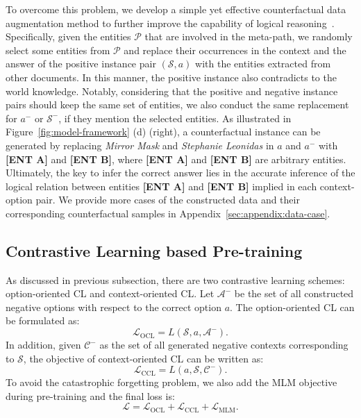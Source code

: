 To overcome this problem, we develop a simple yet effective counterfactual data augmentation method to further improve the capability of logical reasoning~\citep{counterfactual-ner}. 
Specifically, given the entities $\mathcal{P}$ that are involved in the meta-path, we randomly select some entities from $\mathcal{P}$ and replace their occurrences in the context and the answer of the positive instance pair $(\mathcal{S}, a)$ with the entities extracted from other documents. In this manner, the positive instance also contradicts to the world knowledge.
Notably, considering that the positive and negative instance pairs should keep the same set of entities, we also conduct the same replacement for $a^-$ or $\mathcal{S}^-$, if they mention the selected entities.
As illustrated in Figure~\ref{fig:model-framework} (d) (right), a counterfactual instance can be generated by replacing \textit{Mirror Mask} and \textit{Stephanie Leonidas} in $a$ and $a^-$ with \textbf{[ENT A]} and \textbf{[ENT B]}, where \textbf{[ENT A]} and \textbf{[ENT B]} are arbitrary entities.
Ultimately, the key to infer the correct answer lies in the accurate inference of the logical relation between entities \textbf{[ENT A]} and \textbf{[ENT B]} implied in each context-option pair.
We provide more cases of the constructed data and their corresponding counterfactual samples in Appendix~\ref{sec:appendix:data-case}.



\subsection{Contrastive Learning based Pre-training}
\label{sec:method:cl}

As discussed in previous subsection, there are 
two contrastive learning schemes: option-oriented CL and context-oriented CL. 
Let $\mathcal{A}^-$ be the set of all constructed negative options with respect to the correct option $a$. The option-oriented CL can be formulated as:
\begin{equation}
\mathcal{L}_{\mathrm{OCL}}=L(\mathcal{S},a,\mathcal{A}^-).
    \label{eqn:ocl}
\end{equation}
In addition, given $\mathcal{C}^-$ as the set of all generated negative contexts corresponding to $\mathcal{S}$, the objective of context-oriented CL can be written as:
\begin{equation}
\mathcal{L}_{\mathrm{CCL}}=L(a,\mathcal{S},\mathcal{C}^-).
    \label{eqn:ccl}
\end{equation}
To avoid the catastrophic forgetting problem, we also add the MLM objective during pre-training and the final loss is:
\begin{equation}
\mathcal{L}=\mathcal{L}_{\mathrm{OCL}} + \mathcal{L}_{\mathrm{CCL}}+\mathcal{L}_{\mathrm{MLM}}.
\end{equation}

